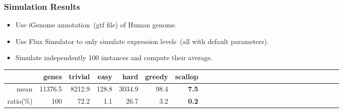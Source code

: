 \frame
{
	\frametitle{Simulation Results}

	\begin{itemize}
	\item Use iGenome annotation~(gtf file) of Human genome.
	\vspace{0.2cm}
	\item Use Flux Simulator to only simulate expression levels~(all with default parameters).
	\vspace{0.2cm}
	\item Simulate independently 100 instances and compute their average.
	\vspace{0.2cm}
	\end{itemize}

	\def\SA{\hspace*{0pt}}
	\def\SC{\hspace*{-2pt}}
	\def\SB{\hspace*{1pt}}
	\def\SD{\hspace*{3pt}}

	\begin{center}%
		\setlength{\tabcolsep}{5pt}%
		\begin{tabular}{rrrrrrrrrrrrrrrrrrrrrrrrrrr}%
		\hline
		     & genes & trivial & easy & hard & greedy & scallop \\
		\hline
		mean & 11376.5 & 8212.9 & 128.8 & 3034.9& 98.4 & {\bf 7.5} \\
		\hline
		ratio(\%)  & 100 & 72.2  & 1.1 & 26.7 & 3.2 & {\bf 0.2} \\
		\hline
		\end{tabular}%
	\end{center}%
}

